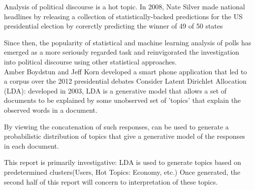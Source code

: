 Analysis of political discourse is a hot topic. In 2008, Nate Silver made national headlines by releasing a collection of statistically-backed predictions for the US presidential election by corerctly predicting the winner of 49 of 50 states \cite{Silver} 

Since then, the popularity of statistical and machine learning analysis of polls has emerged as a more seriously regarded task and reinvigorated the investigation into political discourse using other statistical approaches.\\

Amber Boydstun and Jeff Korn developed a smart phone application that led to a corpus over the 2012 presidential debates\cite{Boydstun}
Consider Latent Dirichlet Allocation (LDA): developed in 2003, LDA is a generative model that allows a set of documents to be explained by some unobserved set of 'topics' that explain the observed words in a document.

By viewing the concatenation of such responses, can be used to generate a probabilistic distribution of topics that give a generative model of the responses in each document.

This report is primarily investigative: LDA is used to generate topics based on predetermined clusters(Users, Hot Topics: Economy, etc.) Once generated, the second half of this report will concern to interpretation of these topics.
